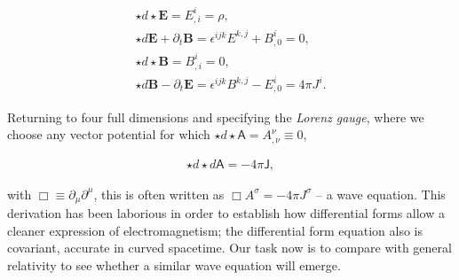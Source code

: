 
\begin{eqnarray}
\star d \star \textbf{E} = E^i_{,i} = \rho,\\
\star d \textbf{E} + \partial_t \textbf{B} = \epsilon^{ijk} E^{k,j} + B^i_{,0} = 0,\\
\star d \star \textbf{B} = B^i_{,i} = 0,\\
\star d \textbf{B} - \partial_t \textbf{E} = \epsilon^{ijk} B^{k,j} - E^i_{,0} = 4 \pi J^i.
\end{eqnarray}

Returning to four full dimensions and specifying the \textit{Lorenz gauge}, where we choose any vector potential for which $\star d \star \textsf{A} = A^\nu_{,\nu} \equiv 0$, 

\begin{eqnarray}
\star d \star d \textsf{A} = -4\pi \textsf{J},
\end{eqnarray}
        
\noindent with $\Box \equiv \partial_\mu \partial^\mu$, this is often written as $\Box A^\sigma = -4 \pi J^\sigma$ -- a wave equation. 
This derivation has been laborious in order to establish how differential forms allow a cleaner expression of electromagnetism; the differential form equation also is covariant, accurate in curved spacetime.
Our task now is to compare with general relativity to see whether a similar wave equation will emerge.
